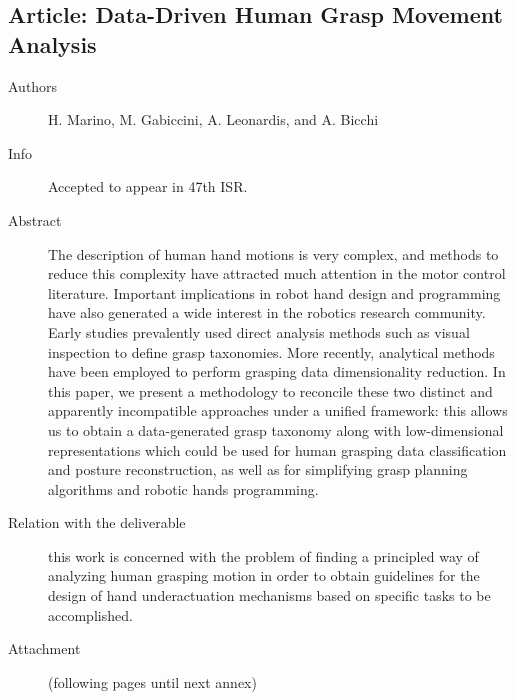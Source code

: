 \documentclass[a4paper,11pt,pdf]{pacmanreport}
\begin{document}

\subsection{Article: Data-Driven Human Grasp Movement Analysis}
\label{ann:DataDrivenHumanGraspMovementAnalysis}
\begin{description}
    \item[Authors] H. Marino, M. Gabiccini, A. Leonardis, and A. Bicchi
    \item[Info] Accepted to appear in 47th ISR.
    \item[Abstract] The description of human hand motions is very complex, and methods to reduce this complexity have attracted much attention in the motor control literature. Important implications in robot hand design and programming have also generated a wide interest in the robotics research community.
    Early studies prevalently used direct analysis methods such as visual inspection to define grasp taxonomies. More recently, analytical methods have been employed to perform grasping data dimensionality reduction. In this paper, we present a methodology to reconcile these two distinct and apparently incompatible approaches under a unified framework: this allows us to obtain a data-generated grasp taxonomy along with low-dimensional representations which could be used for human grasping data classification and posture reconstruction, as well as for simplifying grasp planning algorithms and robotic hands programming.
    \item[Relation with the deliverable] this work is concerned with the problem of finding a principled way of analyzing human grasping motion in order to obtain guidelines for the design of hand underactuation mechanisms based on specific tasks to be accomplished.
    \item[Attachment] (following pages until next annex)
\end{description}

\end{document}
